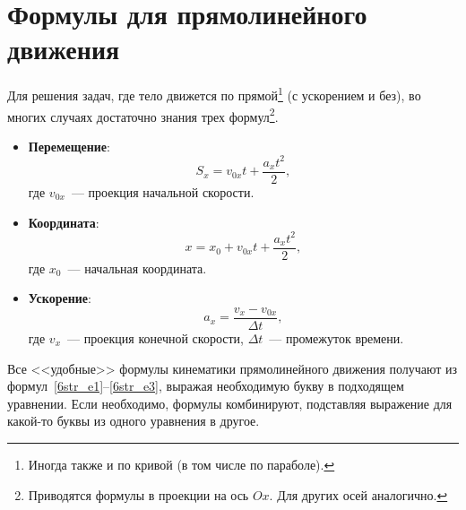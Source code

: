 \documentclass[main.tex]{subfiles}
\begin{document}


 

 

 
   

\section{Формулы для прямолинейного движения}


Для решения задач, где тело движется по прямой\footnote{Иногда также и по кривой (в том числе по параболе).} (с ускорением и без), во многих случаях достаточно знания трех формул\footnote{Приводятся формулы в проекции на ось $Ox$. Для других осей аналогично.}.
\begin{itemize}
    \item \textbf{Перемещение}:
    \begin{equation}
    \label{6str_e1}
    S_x=v_{0x}t+\dfrac{a_xt^2}{2},
    \end{equation}
    где $v_{0x}$~--- проекция начальной скорости.
    \item \textbf{Координата}:
    \begin{equation}
    \label{6str_e2}
    x=x_0+v_{0x}t+\dfrac{a_xt^2}{2},
    \end{equation}
    где $x_0$~--- начальная координата.
    \item \textbf{Ускорение}:
    \begin{equation}
    \label{6str_e3}
    a_x=\dfrac{v_x-v_{0x}}{\Delta t},
    \end{equation}
    где $v_{x}$~--- проекция конечной скорости, $\Delta t$~--- промежуток времени.
\end{itemize}

Все <<удобные>> формулы кинематики прямолинейного движения получают из формул~\eqref{6str_e1}--\eqref{6str_e3}, выражая необходимую букву в подходящем уравнении. Если необходимо, формулы комбинируют, подставляя выражение для какой-то буквы из одного уравнения в другое.
\end{document}
